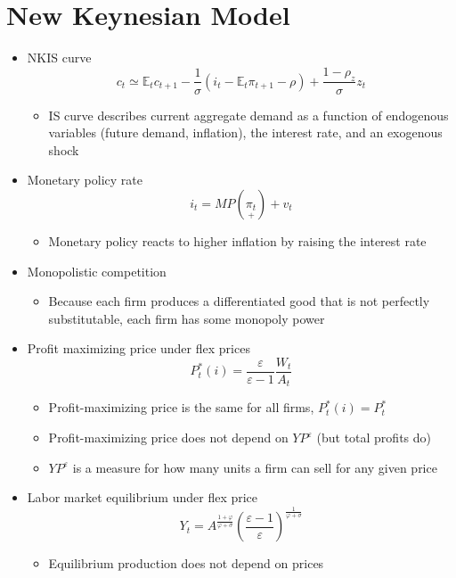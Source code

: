 \documentclass[a4paper]{article}
\begin{document}
\section{New Keynesian Model}
\begin{itemize}
    \item NKIS curve
    \[c_t\simeq \mathbb{E}_t c_{t+1} - \frac{1}{\sigma}(i_t-\mathbb{E}_t\pi_{t+1}-\rho)+\frac{1-\rho_z}{\sigma}z_t \]
    \begin{itemize}
        \item IS curve describes current aggregate demand as a function of endogenous variables (future demand, inflation), the interest rate, and an exogenous shock
    \end{itemize}
    \item Monetary policy rate
    \[i_t=MP\left(\underset{+}{\pi_t} \right) + v_t \]
    \begin{itemize}
        \item Monetary policy reacts to higher inflation by raising the interest rate
    \end{itemize}
    \item Monopolistic competition
    \begin{itemize}
        \item Because each firm produces a differentiated good that is not perfectly substitutable, each firm has some monopoly power
    \end{itemize}
    \item Profit maximizing price under flex prices
    \[P_t^*(i)=\frac{\varepsilon}{\varepsilon-1}\frac{W_t}{A_t} \]
    \begin{itemize}
        \item Profit-maximizing price is the same for all firms, $P_t^*(i)=P_t^*$
        \item Profit-maximizing price does not depend on $YP^{\varepsilon}$ (but total profits do)
        \item $YP^{\varepsilon}$ is a measure for how many units a firm can sell for any given price
    \end{itemize}
    \item Labor market equilibrium under flex price
    \[Y_t=A^{\frac{1+\varphi}{\varphi+\sigma}}\left(\frac{\varepsilon-1}{\varepsilon} \right)^{\frac{1}{\varphi+\sigma}} \]
    \begin{itemize}
        \item Equilibrium production does not depend on prices
    \end{itemize}

\end{itemize}
\end{document}
